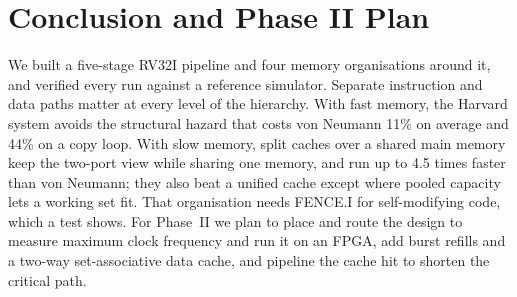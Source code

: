 \documentclass[conference]{IEEEtran}
\begin{document}
\section{Conclusion and Phase II Plan}

We built a five-stage RV32I pipeline and four memory organisations around it, and verified every run against a reference simulator. Separate instruction and data paths matter at every level of the hierarchy. With fast memory, the Harvard system avoids the structural hazard that costs von Neumann 11\% on average and 44\% on a copy loop. With slow memory, split caches over a shared main memory keep the two-port view while sharing one memory, and run up to 4.5 times faster than von Neumann; they also beat a unified cache except where pooled capacity lets a working set fit. That organisation needs FENCE.I for self-modifying code, which a test shows. For Phase~II we plan to place and route the design to measure maximum clock frequency and run it on an FPGA, add burst refills and a two-way set-associative data cache, and pipeline the cache hit to shorten the critical path.
\end{document}
